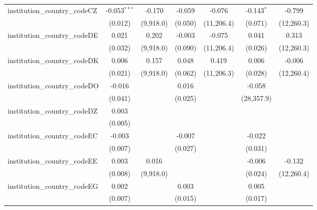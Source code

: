 \begin{tabular}{lcccccc}
   institution\_country\_codeCZ          & -0.053$^{***}$ & -0.170        & -0.059        & -0.076       & -0.143$^{*}$ & -0.799\\   
                                         & (0.012)        & (9,918.0)     & (0.050)       & (11,206.4)   & (0.071)      & (12,260.3)\\   
   institution\_country\_codeDE          & 0.021          & 0.202         & -0.003        & -0.075       & 0.041        & 0.313\\   
                                         & (0.032)        & (9,918.0)     & (0.090)       & (11,206.4)   & (0.026)      & (12,260.3)\\   
   institution\_country\_codeDK          & 0.006          & 0.157         & 0.048         & 0.419        & 0.006        & -0.006\\   
                                         & (0.021)        & (9,918.0)     & (0.062)       & (11,206.3)   & (0.028)      & (12,260.4)\\   
   institution\_country\_codeDO          & -0.016         &               & 0.016         &              & -0.058       &   \\   
                                         & (0.041)        &               & (0.025)       &              & (28,357.9)   &   \\   
   institution\_country\_codeDZ          & 0.003          &               &               &              &              &   \\   
                                         & (0.005)        &               &               &              &              &   \\   
   institution\_country\_codeEC          & -0.003         &               & -0.007        &              & -0.022       &   \\   
                                         & (0.007)        &               & (0.027)       &              & (0.031)      &   \\   
   institution\_country\_codeEE          & 0.003          & 0.016         &               &              & -0.006       & -0.132\\   
                                         & (0.008)        & (9,918.0)     &               &              & (0.024)      & (12,260.4)\\   
   institution\_country\_codeEG          & 0.002          &               & 0.003         &              & 0.005        &   \\   
                                         & (0.007)        &               & (0.015)       &              & (0.017)      &   \\   

\end{tabular}
